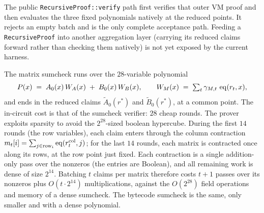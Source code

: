 The public \texttt{RecursiveProof::verify} path first verifies that outer VM proof and then evaluates the three fixed polynomials natively at the reduced points. It rejects an empty batch and is the only complete acceptance path. Feeding a \texttt{RecursiveProof} into another aggregation layer (carrying its reduced claims forward rather than checking them natively) is not yet exposed by the current harness.

The matrix sumcheck runs over the $28$-variable polynomial
\[
  P(x) \;=\; A_0(x)\,W_A(x) \;+\; B_0(x)\,W_B(x),
  \qquad
  W_M(x) \;=\; \textstyle\sum_t \gamma_{M,t}\,\operatorname{eq}(r_t,x),
\]
and ends in the reduced claims $\widetilde A_0(r^\ast)$ and $\widetilde B_0(r^\ast)$, at a common point. The in-circuit cost is that of the sumcheck verifier: $28$ cheap rounds. The prover exploits sparsity to avoid the $2^{28}$-sized boolean hypercube. During the first $14$ rounds (the row variables), each claim enters through the column contraction $m_t[i]=\sum_{j\in\mathrm{row}_i}\operatorname{eq}(r_t^{\mathrm{col}},j)$; for the last $14$ rounds, each matrix is contracted once along its rows, at the row point just fixed. Each contraction is a single addition-only pass over the nonzeros (the entries are Boolean), and all remaining work is dense of size $2^{14}$. Batching $t$ claims per matrix therefore costs $t+1$ passes over its nonzeros plus $O(t\cdot2^{14})$ multiplications, against the $O(2^{28})$ field operations and memory of a dense sumcheck. The bytecode sumcheck is the same, only smaller and with a dense polynomial.
